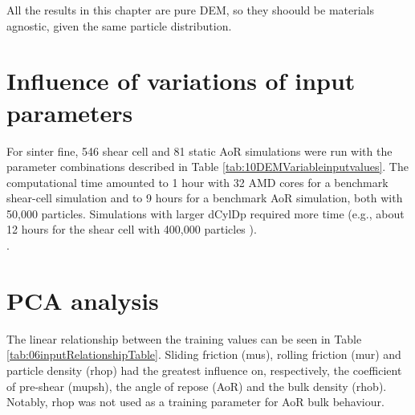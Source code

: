 All the results in this chapter are pure \acs{DEM}, so they shoould be
materials agnostic, given the same particle distribution.


\section{Influence of variations of input parameters}
\label{sec:influence}

For sinter fine, 546 shear cell and 81 static \acs{AoR} simulations 
were run with
the parameter combinations described in Table
\ref{tab:10DEMVariableinputvalues}.
The computational time amounted to 1 hour with 32 AMD cores for a benchmark
shear-cell simulation and to 9 hours for a benchmark \acs{AoR} simulation, both with
50,000 particles.
Simulations with larger \acs{dCylDp} required more time (e.g., about 12 hours for
the shear cell with 400,000 particles ). \\

.


\section{PCA analysis}
\label{sec:pcaanalysis}

The linear relationship between the
training values can be seen in Table \ref{tab:06inputRelationshipTable}.
Sliding friction (\acs{mus}), rolling friction (\acs{mur}) and particle density (\acs{rhop})
had the greatest influence on, respectively, the coefficient of pre-shear
(\acs{mupsh}), the angle of repose  (\acs{AoR}) and the bulk density (\acs{rhob}). Notably, \acs{rhop}
was not used as a training parameter for \acs{AoR} bulk behaviour. 

